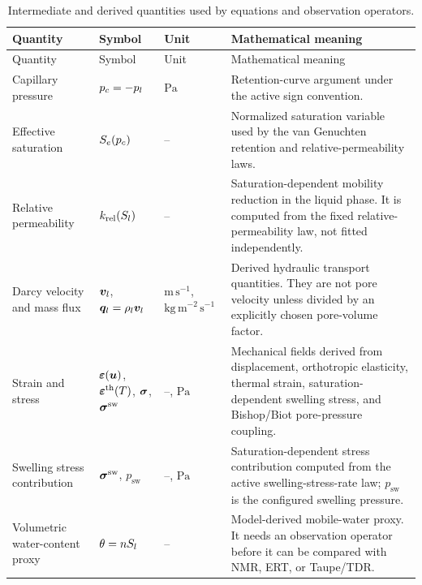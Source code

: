 \begingroup
\small
\setlength{\tabcolsep}{3pt}
\begin{longtable}{@{}L{0.20\textwidth} L{0.16\textwidth} L{0.16\textwidth} L{0.38\textwidth}@{}}
\caption{Intermediate and derived quantities used by equations and observation operators.}
\label{tab:intermediate-derived-fields}\\
\toprule
Quantity & Symbol & Unit & Mathematical meaning\\
\midrule
\endfirsthead
\toprule
Quantity & Symbol & Unit & Mathematical meaning\\
\midrule
\endhead
\bottomrule
\endlastfoot
Capillary pressure &
\(p_c=-p_l\) &
\(\mathrm{Pa}\) &
Retention-curve argument under the active sign convention.\\
Effective saturation &
\(S_e(p_c)\) &
-- &
Normalized saturation variable used by the van Genuchten retention and
relative-permeability laws.\\
Relative permeability &
\(k_{\mathrm{rel}}(S_l)\) &
-- &
Saturation-dependent mobility reduction in the liquid phase.  It is computed from
the fixed relative-permeability law, not fitted independently.\\
Darcy velocity and mass flux &
\(\bm{v}_{l}\), \(\bm{q}_{l}=\rho_l\bm{v}_{l}\) &
\(\mathrm{m\,s^{-1}}\), \(\mathrm{kg\,m^{-2}\,s^{-1}}\) &
Derived hydraulic transport quantities.  They are not pore velocity unless divided
by an explicitly chosen pore-volume factor.\\
Strain and stress &
\(\bm{\varepsilon}(\bm{u})\), \(\bm{\varepsilon}^{\mathrm{th}}(T)\), \(\bm{\sigma}\), \(\bm{\sigma}^{\mathrm{sw}}\) &
--, \(\mathrm{Pa}\) &
Mechanical fields derived from displacement, orthotropic elasticity, thermal strain,
saturation-dependent swelling stress, and Bishop/Biot pore-pressure coupling.\\
Swelling stress contribution &
\(\bm{\sigma}^{\mathrm{sw}}\), \(p_{\mathrm{sw}}\) &
--, \(\mathrm{Pa}\) &
Saturation-dependent stress contribution computed from the active
swelling-stress-rate law; \(p_{\mathrm{sw}}\) is the configured swelling pressure.\\
Volumetric water-content proxy &
\(\theta=nS_l\) &
-- &
Model-derived mobile-water proxy.  It needs an observation operator before it can be
compared with NMR, ERT, or Taupe/TDR.\\
\end{longtable}
\endgroup
